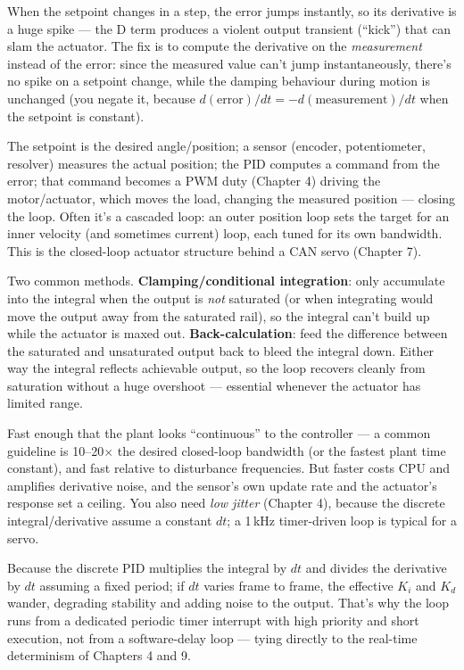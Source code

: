 When the setpoint changes in a step, the error jumps instantly, so its
derivative is a huge spike --- the D term produces a violent output transient
(``kick'') that can slam the actuator. The fix is to compute the derivative on
the \emph{measurement} instead of the error: since the measured value can't jump
instantaneously, there's no spike on a setpoint change, while the damping
behaviour during motion is unchanged (you negate it, because $d(\text{error})/dt
= -d(\text{measurement})/dt$ when the setpoint is constant).

The setpoint is the desired angle/position; a sensor (encoder, potentiometer,
resolver) measures the actual position; the PID computes a command from the
error; that command becomes a PWM duty (Chapter 4) driving the motor/actuator,
which moves the load, changing the measured position --- closing the loop. Often
it's a cascaded loop: an outer position loop sets the target for an inner
velocity (and sometimes current) loop, each tuned for its own bandwidth. This is
the closed-loop actuator structure behind a CAN servo (Chapter 7).

Two common methods. \textbf{Clamping/conditional integration}: only accumulate
into the integral when the output is \emph{not} saturated (or when integrating
would move the output away from the saturated rail), so the integral can't build
up while the actuator is maxed out. \textbf{Back-calculation}: feed the
difference between the saturated and unsaturated output back to bleed the
integral down. Either way the integral reflects achievable output, so the loop
recovers cleanly from saturation without a huge overshoot --- essential whenever
the actuator has limited range.

Fast enough that the plant looks ``continuous'' to the controller --- a common
guideline is 10--20$\times$ the desired closed-loop bandwidth (or the fastest
plant time constant), and fast relative to disturbance frequencies. But faster
costs CPU and amplifies derivative noise, and the sensor's own update rate and
the actuator's response set a ceiling. You also need \emph{low jitter}
(Chapter 4), because the discrete integral/derivative assume a constant $dt$;
a 1\,kHz timer-driven loop is typical for a servo.

Because the discrete PID multiplies the integral by $dt$ and divides the
derivative by $dt$ assuming a fixed period; if $dt$ varies frame to frame, the
effective $K_i$ and $K_d$ wander, degrading stability and adding noise to the
output. That's why the loop runs from a dedicated periodic timer interrupt with
high priority and short execution, not from a software-delay loop --- tying
directly to the real-time determinism of Chapters 4 and 9.

